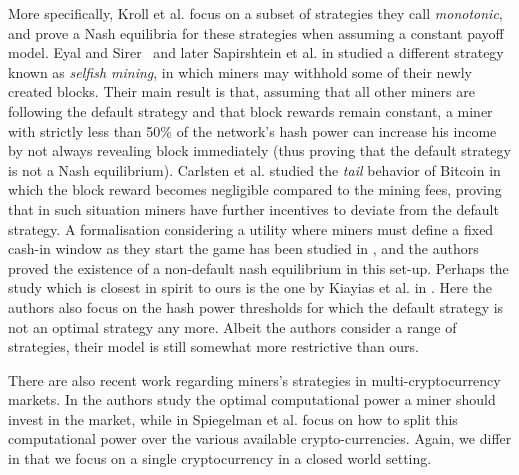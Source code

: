 More specifically,  Kroll et al. \cite{economics_of_mining2013} focus on a subset of strategies they call \emph{monotonic}, and prove a 
Nash equilibria for these strategies when assuming a constant payoff model. Eyal and Sirer~\cite{selfishmining2014}  and later Sapirshtein et al. in \cite{optimalselfishmining2017} studied a different strategy known as \emph{selfish mining}, in which miners may withhold some of their newly created blocks. Their main result is that, assuming that all other miners are following the default strategy and that block rewards remain constant, a miner with strictly less than 50\% of the network's hash power can increase his income by not always revealing block immediately (thus proving that the default strategy is not a Nash equilibrium). Carlsten et al. \cite{instabilitywithoutreward:2016} studied the \emph{tail} behavior of Bitcoin in which the block reward becomes negligible compared to the mining fees, proving that in such situation miners have further incentives to deviate from the default strategy. 
A formalisation considering a utility where miners must define a fixed cash-in window as they start the game has been studied in \cite{biais2018blockchain}, and the authors proved the existence of a non-default nash equilibrium in this set-up.
Perhaps the study which is closest in spirit to ours is the one by Kiayias et al. in \cite{mininggames:2016}. %
Here the authors also focus on the hash power thresholds for which the default strategy is not an optimal strategy any more. Albeit the authors consider a range of strategies, their model is still somewhat more restrictive than ours. %

There are also recent work regarding miners's strategies in multi-cryptocurrency markets. In \cite{dhamal2018stochastic} the authors study the optimal computational power a miner should invest in the market, while in \cite{spiegelman2018game} Spiegelman et al. focus on how to split this computational power over the various available crypto-currencies. Again, we differ in that we focus on a single cryptocurrency in a closed world setting.
